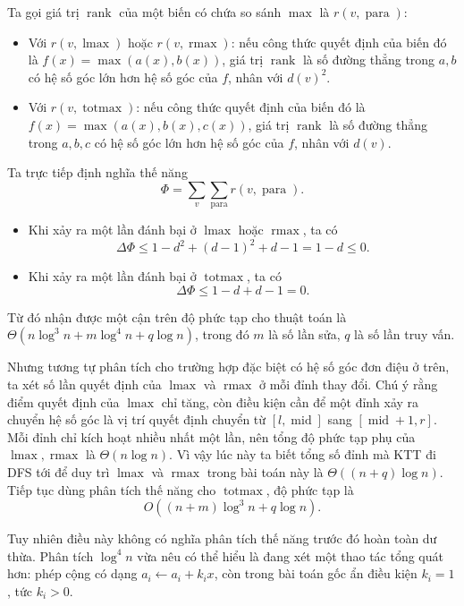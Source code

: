 \documentclass[11pt]{article}
\begin{document}
Ta gọi giá trị \(\operatorname{rank}\) của một biến có chứa so sánh \(\max\) là
\(r(v,\operatorname{para})\):

\begin{itemize}
  \item Với \(r(v,\operatorname{lmax})\) hoặc \(r(v,\operatorname{rmax})\): nếu
  công thức quyết định của biến đó là \(f(x)=\max(a(x),b(x))\), giá trị
  \(\operatorname{rank}\) là số đường thẳng trong \(a,b\) có hệ số góc lớn hơn
  hệ số góc của \(f\), nhân với \(d(v)^2\).
  \item Với \(r(v,\operatorname{totmax})\): nếu công thức quyết định của biến đó
  là \(f(x)=\max(a(x),b(x),c(x))\), giá trị \(\operatorname{rank}\) là số đường
  thẳng trong \(a,b,c\) có hệ số góc lớn hơn hệ số góc của \(f\), nhân với
  \(d(v)\).
\end{itemize}

Ta trực tiếp định nghĩa thế năng
\[
  \Phi=\sum_v\sum_{\operatorname{para}} r(v,\operatorname{para}).
\]

\begin{itemize}
  \item Khi xảy ra một lần đánh bại ở \(\operatorname{lmax}\) hoặc
  \(\operatorname{rmax}\), ta có
  \[
    \Delta\Phi\le 1-d^2+(d-1)^2+d-1=1-d\le 0.
  \]
  \item Khi xảy ra một lần đánh bại ở \(\operatorname{totmax}\), ta có
  \[
    \Delta\Phi\le 1-d+d-1=0.
  \]
\end{itemize}

Từ đó nhận được một cận trên độ phức tạp cho thuật toán là
\(\Theta(n\log^3 n+m\log^4 n+q\log n)\), trong đó \(m\) là số lần sửa, \(q\) là
số lần truy vấn.

Nhưng tương tự phân tích cho trường hợp đặc biệt có hệ số góc đơn điệu ở trên,
ta xét số lần quyết định của \(\operatorname{lmax}\) và \(\operatorname{rmax}\)
ở mỗi đỉnh thay đổi. Chú ý rằng điểm quyết định của \(\operatorname{lmax}\) chỉ
tăng, còn điều kiện cần để một đỉnh xảy ra chuyển hệ số góc là vị trí quyết định
chuyển từ \([l,\operatorname{mid}]\) sang \([\operatorname{mid}+1,r]\). Mỗi đỉnh
chỉ kích hoạt nhiều nhất một lần, nên tổng độ phức tạp phụ của
\(\operatorname{lmax},\operatorname{rmax}\) là \(\Theta(n\log n)\). Vì vậy lúc
này ta biết tổng số đỉnh mà KTT đi DFS tới để duy trì \(\operatorname{lmax}\) và
\(\operatorname{rmax}\) trong bài toán này là \(\Theta((n+q)\log n)\). Tiếp tục
dùng phân tích thế năng cho \(\operatorname{totmax}\), độ phức tạp là
\[
  O((n+m)\log^3 n+q\log n).
\]

Tuy nhiên điều này không có nghĩa phân tích thế năng trước đó hoàn toàn dư
thừa. Phân tích \(\log^4 n\) vừa nêu có thể hiểu là đang xét một thao tác tổng
quát hơn: phép cộng có dạng \(a_i\gets a_i+k_ix\), còn trong bài toán gốc ẩn
điều kiện \(k_i=1\), tức \(k_i>0\).
\end{document}
